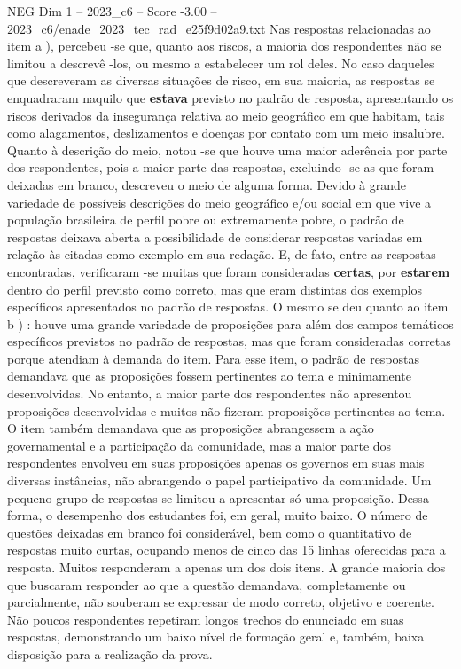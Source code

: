 \begin{textsample}{NEG Dim 1 – 2023\_c6 – Score -3.00 – 2023\_c6/enade\_2023\_tec\_rad\_e25f9d02a9.txt}
Nas respostas relacionadas ao item a ), percebeu -se que, quanto aos riscos, a maioria dos respondentes não se limitou a descrevê -los, ou mesmo a estabelecer um rol deles.
No caso daqueles que descreveram as diversas situações de risco, em sua maioria, as respostas se enquadraram naquilo que \textbf{estava} previsto no padrão de resposta, apresentando os riscos derivados da insegurança relativa ao meio geográfico em que habitam, tais como alagamentos, deslizamentos e doenças por contato com um meio insalubre.
Quanto à descrição do meio, notou -se que houve uma maior aderência por parte dos respondentes, pois a maior parte das respostas, excluindo -se as que foram deixadas em branco, descreveu o meio de alguma forma.
Devido à grande variedade de possíveis descrições do meio geográfico e/ou social em que vive a população brasileira de perfil pobre ou extremamente pobre, o padrão de respostas deixava aberta a possibilidade de considerar respostas variadas em relação às citadas como exemplo em sua redação.
E, de fato, entre as respostas encontradas, verificaram -se muitas que foram consideradas \textbf{certas}, por \textbf{estarem} dentro do perfil previsto como correto, mas que eram distintas dos exemplos específicos apresentados no padrão de respostas.
O mesmo se deu quanto ao item b ) : houve uma grande variedade de proposições para além dos campos temáticos específicos previstos no padrão de respostas, mas que foram consideradas corretas porque atendiam à demanda do item.
Para esse item, o padrão de respostas demandava que as proposições fossem pertinentes ao tema e minimamente desenvolvidas.
No entanto, a maior parte dos respondentes não apresentou proposições desenvolvidas e muitos não fizeram proposições pertinentes ao tema.
O item também demandava que as proposições abrangessem a ação governamental e a participação da comunidade, mas a maior parte dos respondentes envolveu em suas proposições apenas os governos em suas mais diversas instâncias, não abrangendo o papel participativo da comunidade.
Um pequeno grupo de respostas se limitou a apresentar só uma proposição.
Dessa forma, o desempenho dos estudantes foi, em geral, muito baixo.
O número de questões deixadas em branco foi considerável, bem como o quantitativo de respostas muito curtas, ocupando menos de cinco das 15 linhas oferecidas para a resposta.
Muitos responderam a apenas um dos dois itens.
A grande maioria dos que buscaram responder ao que a questão demandava, completamente ou parcialmente, não souberam se expressar de modo correto, objetivo e coerente.
Não poucos respondentes repetiram longos trechos do enunciado em suas respostas, demonstrando um baixo nível de formação geral e, também, baixa disposição para a realização da prova.

\end{textsample}
